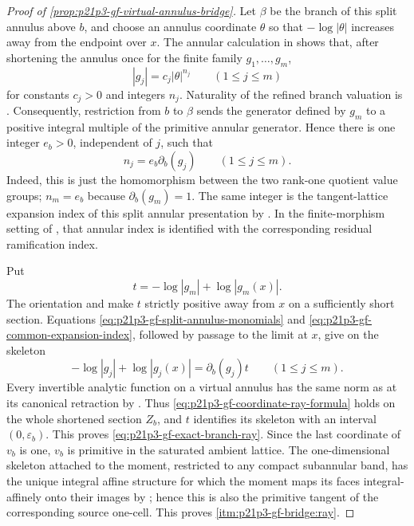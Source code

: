 \begin{proof}[Proof of
\cref{prop:p21p3-gf-virtual-annulus-bridge}]
Let \(\beta\) be the branch of this split annulus above \(b\), and choose an
annulus coordinate \(\theta\) so that \(-\log|\theta|\) increases away from
the endpoint over \(x\).
The annular calculation in
\cite[\S\S3.6.22--3.6.24 and \S4.3.6.4]
{Ducros24CurveStructure} shows that, after shortening the annulus once for
the finite family \(g_1,\ldots,g_m\),
\begin{equation}
\label{eq:p21p3-gf-split-annulus-monomials}
                  |g_j|=c_j|\theta|^{n_j}
                  \qquad(1\leq j\leq m)
\end{equation}
for constants \(c_j>0\) and integers \(n_j\).  Naturality of the refined
branch valuation is \cite[\S4.2.9]{Ducros24CurveStructure}.  Consequently,
restriction from \(b\) to \(\beta\) sends the generator defined by \(g_m\) to
a positive integral multiple of the primitive annular generator.  Hence
there is one integer \(e_b>0\), independent of \(j\), such that
\begin{equation}
\label{eq:p21p3-gf-common-expansion-index}
                       n_j=e_b\partial_b(g_j)
                       \qquad(1\leq j\leq m).
\end{equation}
Indeed, this is just the homomorphism between the two rank-one quotient
value groups; \(n_m=e_b\) because \(\partial_b(g_m)=1\).  The same integer
is the tangent-lattice expansion index of this split annular presentation
by \cite[\S3.6.24.2]{Ducros24CurveStructure}.  In the finite-morphism
setting of \cite[Theorem~4.3.13(i)]{Ducros24CurveStructure}, that annular
index is identified with the corresponding residual ramification index.

Put
\[
 t=-\log|g_m|+\log|g_m(x)|.
\]
The orientation and
\cite[\S4.2.11.1]{Ducros24CurveStructure} make \(t\) strictly positive
away from \(x\) on a sufficiently short section.  Equations
\eqref{eq:p21p3-gf-split-annulus-monomials} and
\eqref{eq:p21p3-gf-common-expansion-index}, followed by passage to the
limit at \(x\), give on the skeleton
\begin{equation}
\label{eq:p21p3-gf-coordinate-ray-formula}
 -\log|g_j|+\log|g_j(x)|
       =\partial_b(g_j)t
       \qquad(1\leq j\leq m).
\end{equation}
Every invertible analytic function on a virtual annulus has the same norm
as at its canonical retraction by
\cite[\S3.6.35.8]{Ducros24CurveStructure}.  Thus
\eqref{eq:p21p3-gf-coordinate-ray-formula} holds on the whole shortened
section \(Z_b\), and \(t\) identifies its skeleton with an interval
\((0,\varepsilon_b)\).  This proves
\eqref{eq:p21p3-gf-exact-branch-ray}.  Since the last coordinate of \(v_b\)
is one, \(v_b\) is primitive in the saturated ambient lattice.  The
one-dimensional skeleton attached to the moment, restricted to any compact
subannular band, has the unique integral affine structure for which the
moment maps its faces integral-affinely onto their images by
\cite[\S8.13]{GJR26}; hence this is also the primitive tangent of the
corresponding source one-cell.  This proves
\cref{itm:p21p3-gf-bridge:ray}.


\end{proof}
